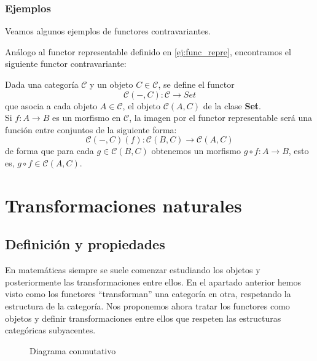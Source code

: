 \subsubsection{Ejemplos}

Veamos algunos ejemplos de functores contravariantes.

\begin{ejemplo}
    Análogo al functor representable definido en \ref{ej:func_repre}, encontramos el siguiente functor contravariante:

    Dada una categoría $\mathscr{C}$ y un objeto $C \in \mathscr{C}$, se define el functor \begin{equation}
        \mathscr{C}(-,C): \mathscr{C} \longrightarrow Set
    \end{equation} que asocia a cada objeto $A \in \mathscr{C}$, el objeto $\mathscr{C}(A,C)$ de la clase \textbf{Set}. \\
    Si $f: A \longrightarrow B$ es un morfismo en $\mathscr{C}$, la imagen por el functor representable será una función entre conjuntos de la siguiente forma: \begin{equation}
        \mathscr{C}(-,C)(f): \mathscr{C}(B,C) \longrightarrow \mathscr{C}(A,C)
    \end{equation} de forma que para cada $g \in \mathscr{C}(B,C)$ obtenemos un morfismo $g \circ f: A \longrightarrow B$, esto es, $g \circ f \in \mathscr{C}(A,C).$    
\end{ejemplo}

\section{Transformaciones naturales}
\subsection{Definición y propiedades}
En matemáticas siempre se suele comenzar estudiando los objetos y posteriormente las transformaciones entre ellos. En el apartado anterior hemos visto como los functores ``transforman'' una categoría en otra, respetando la estructura de la categoría. Nos proponemos ahora tratar los functores como objetos y definir transformaciones entre ellos que respeten las estructuras categóricas subyacentes. 

\begin{figure}[htpb]
    \centering
    \caption{Diagrama conmutativo}
    \label{diag:trans_natural}
\end{figure}


